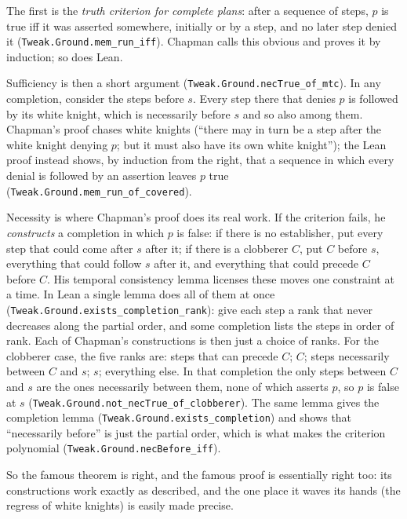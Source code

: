 \documentclass[11pt]{article}
\newcommand{\lean}[1]{\texttt{#1}}
\begin{document}
The first is the \emph{truth criterion for complete plans}: after a
sequence of steps, $p$ is true iff it was asserted somewhere, initially or
by a step, and no later step denied it (\lean{Tweak.Ground.mem\_run\_iff}).
Chapman calls this obvious and proves it by induction; so does Lean.

Sufficiency is then a short argument (\lean{Tweak.Ground.necTrue\_of\_mtc}).
In any completion, consider the steps before $s$. Every step there that
denies $p$ is followed by its white knight, which is necessarily before
$s$ and so also among them. Chapman's proof chases white knights (``there
may in turn be a step after the white knight denying $p$; but it must also
have its own white knight''); the Lean proof instead shows, by induction
from the right, that a sequence in which every denial is followed by an
assertion leaves $p$ true (\lean{Tweak.Ground.mem\_run\_of\_covered}).

Necessity is where Chapman's proof does its real work. If the criterion
fails, he \emph{constructs} a completion in which $p$ is false: if there is
no establisher, put every step that could come after $s$ after it; if
there is a clobberer $C$, put $C$ before $s$, everything that could follow
$s$ after it, and everything that could precede $C$ before $C$. His
temporal consistency lemma licenses these moves one constraint at a time.
In Lean a single lemma does all of them at once
(\lean{Tweak.Ground.exists\_completion\_rank}): give each step a rank that
never decreases along the partial order, and some completion lists the
steps in order of rank. Each of Chapman's constructions is then just a
choice of ranks. For the clobberer case, the five ranks are: steps that can
precede $C$; $C$; steps necessarily between $C$ and $s$; $s$; everything
else. In that completion the only steps between $C$ and $s$ are the ones
necessarily between them, none of which asserts $p$, so $p$ is false at
$s$ (\lean{Tweak.Ground.not\_necTrue\_of\_clobberer}). The same lemma gives
the completion lemma (\lean{Tweak.Ground.exists\_completion}) and shows
that ``necessarily before'' is just the partial order, which is what makes
the criterion polynomial (\lean{Tweak.Ground.necBefore\_iff}).

So the famous theorem is right, and the famous proof is essentially right
too: its constructions work exactly as described, and the one place it
waves its hands (the regress of white knights) is easily made precise.
\end{document}
